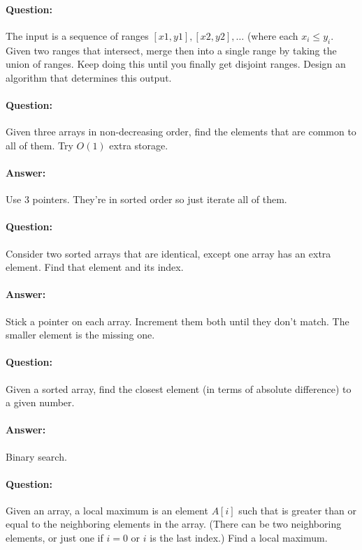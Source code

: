 \documentclass{article}
\begin{document}
\paragraph{Question:} The input is a sequence of ranges \([x1, y1], [x2, y2], \ldots \) (where each \(x_i \leq y_i\). Given two ranges that intersect, merge then into a single range by taking the union of ranges. Keep doing this until you finally get disjoint ranges. Design an algorithm that determines this output.

\paragraph{Question:} Given three arrays in non-decreasing order, find the elements that are common to all of them. Try \(O(1)\) extra storage.

\paragraph{Answer:} Use 3 pointers. They're in sorted order so just iterate all of them.

\paragraph{Question:} Consider two sorted arrays that are identical, except one array has an extra element. Find that element and its index.

\paragraph{Answer:} Stick a pointer on each array. Increment them both until they don't match. The smaller element is the missing one.

\paragraph{Question:} Given a sorted array, find the closest element (in terms of absolute difference) to a given number.

\paragraph{Answer:} Binary search.

\paragraph{Question:} Given an array, a local maximum is an element \(A[i]\) such that is greater than or equal to the neighboring elements in the array. (There can be two neighboring elements, or just one if \(i = 0\) or \(i\) is the last index.) Find a local maximum.
\end{document}
